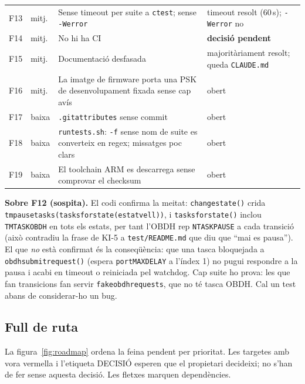 \documentclass[11pt,a4paper]{article}
\DeclareRobustCommand{\_}{\textunderscore\allowbreak}
\newcommand{\cd}[1]{\texttt{#1}}
\begin{document}
\begin{longtable}{@{}l l>{\raggedright\arraybackslash}p{9.6cm}>{\raggedright\arraybackslash}p{4.3cm}@{}}
F13 & mitj. & Sense timeout per suite a \cd{ctest}; sense \cd{-Werror} & timeout resolt (60\,s); \cd{-Werror} no\\
F14 & mitj. & No hi ha CI & \textbf{decisió pendent}\\
F15 & mitj. & Documentació desfasada & majoritàriament resolt; queda \cd{CLAUDE.md}\\
F16 & mitj. & La imatge de firmware porta una PSK de desenvolupament fixada sense cap avís & obert\\
F17 & baixa & \cd{.gitattributes} sense commit & obert\\
F18 & baixa & \cd{run\_tests.sh}: \cd{-f} sense nom de suite es converteix en regex; missatges poc clars & obert\\
F19 & baixa & El toolchain ARM es descarrega sense comprovar el checksum & obert\\
\end{longtable}
\endgroup

\textbf{Sobre F12 (sospita).} El codi confirma la meitat: \cd{change\_state()} crida
\cd{tm\_pause\_tasks(tasks\_for\_state(estat\_vell))}, i \cd{tasks\_for\_state()} inclou
\cd{TM\_TASK\_OBDH} en tots els estats, per tant l'OBDH rep \cd{N\_TASK\_PAUSE} a cada transició
(això contradiu la frase de KI-5 a \cd{test/README.md} que diu que ``mai es pausa''). El que
\emph{no} està confirmat és la conseqüència: que una tasca bloquejada a \cd{obdh\_submit\_request()}
(espera \cd{portMAX\_DELAY} a l'índex 1) no pugui respondre a la pausa i acabi en timeout o
reiniciada pel watchdog. Cap suite ho prova: les que fan transicions fan servir
\cd{fake\_obdh\_requests}, que no té tasca OBDH. Cal un test abans de considerar-ho un bug.

\subsection{Full de ruta}

La figura~\ref{fig:roadmap} ordena la feina pendent per prioritat. Les targetes amb vora vermella
i l'etiqueta DECISIÓ esperen que el propietari decideixi; no s'han de fer sense aquesta
decisió. Les fletxes marquen dependències.
\end{document}
